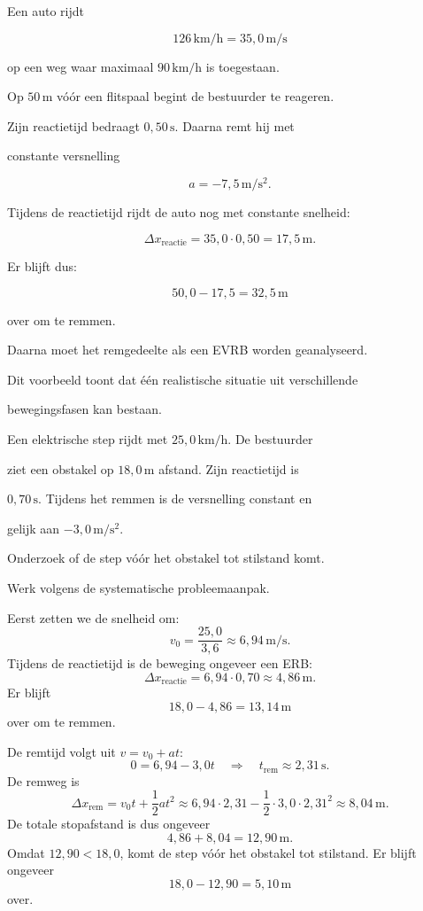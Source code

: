\documentclass{ximera}
\begin{document}
\begin{voorbeeld}

Een auto rijdt

\[126\,\mathrm{km/h}=35,0\,\mathrm{m/s}\]

op een weg waar maximaal $90\,\mathrm{km/h}$ is toegestaan.

Op $50\,\mathrm{m}$ vóór een flitspaal begint de bestuurder te reageren.

Zijn reactietijd bedraagt $0,50\,\mathrm{s}$. Daarna remt hij met

constante versnelling

\[a=-7,5\,\mathrm{m/s^2}.\]

Tijdens de reactietijd rijdt de auto nog met constante snelheid:

\[\Delta x_{\mathrm{reactie}} = 35,0\cdot0,50 = 17,5\,\mathrm{m}.\]

Er blijft dus:

\[50,0-17,5=32,5\,\mathrm{m}\]

over om te remmen.

Daarna moet het remgedeelte als een EVRB worden geanalyseerd.

Dit voorbeeld toont dat één realistische situatie uit verschillende

bewegingsfasen kan bestaan.

\end{voorbeeld}

\begin{oefening}{\oefU\ESS}

Een elektrische step rijdt met $25,0\,\mathrm{km/h}$. De bestuurder

ziet een obstakel op $18,0\,\mathrm{m}$ afstand. Zijn reactietijd is

$0,70\,\mathrm{s}$. Tijdens het remmen is de versnelling constant en

gelijk aan $-3,0\,\mathrm{m/s^2}$.

Onderzoek of de step vóór het obstakel tot stilstand komt.

Werk volgens de systematische probleemaanpak.

\begin{oplossing}
Eerst zetten we de snelheid om:
\[v_0=\frac{25,0}{3,6}\approx6,94\,\mathrm{m/s}.\]
Tijdens de reactietijd is de beweging ongeveer een ERB:
\[\Delta x_{\mathrm{reactie}}=6,94\cdot0,70\approx4,86\,\mathrm{m}.\]
Er blijft
\[18,0-4,86=13,14\,\mathrm{m}\]
over om te remmen.

De remtijd volgt uit \(v=v_0+at\):
\[0=6,94-3,0t \quad\Longrightarrow\quad t_{\mathrm{rem}}\approx2,31\,\mathrm{s}.\]
De remweg is
\[\Delta x_{\mathrm{rem}} =v_0t+\frac12at^2 \approx6,94\cdot2,31-\frac12\cdot3,0\cdot2,31^2 \approx8,04\,\mathrm{m}.\]
De totale stopafstand is dus ongeveer
\[4,86+8,04=12,90\,\mathrm{m}.\]
Omdat \(12,90<18,0\), komt de step vóór het obstakel tot stilstand. Er blijft ongeveer
\[18,0-12,90=5,10\,\mathrm{m}\]
over.
\end{oplossing}

\end{oefening}
\end{document}
